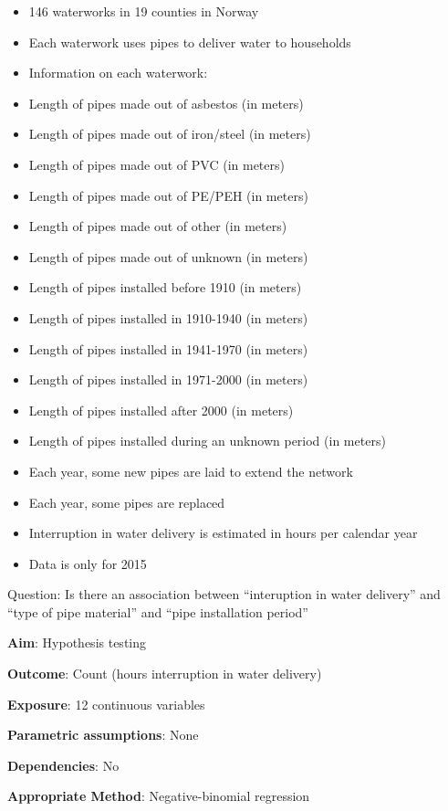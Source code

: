 \documentclass[12pt,]{article}
\providecommand{\tightlist}{%
  \setlength{\itemsep}{0pt}\setlength{\parskip}{0pt}}
\begin{document}
\begin{itemize}
\tightlist
\item
  146 waterworks in 19 counties in Norway
\item
  Each waterwork uses pipes to deliver water to households
\item
  Information on each waterwork:
\item
  Length of pipes made out of asbestos (in meters)
\item
  Length of pipes made out of iron/steel (in meters)
\item
  Length of pipes made out of PVC (in meters)
\item
  Length of pipes made out of PE/PEH (in meters)
\item
  Length of pipes made out of other (in meters)
\item
  Length of pipes made out of unknown (in meters)
\item
  Length of pipes installed before 1910 (in meters)
\item
  Length of pipes installed in 1910-1940 (in meters)
\item
  Length of pipes installed in 1941-1970 (in meters)
\item
  Length of pipes installed in 1971-2000 (in meters)
\item
  Length of pipes installed after 2000 (in meters)
\item
  Length of pipes installed during an unknown period (in meters)
\item
  Each year, some new pipes are laid to extend the network
\item
  Each year, some pipes are replaced
\item
  Interruption in water delivery is estimated in hours per calendar year
\item
  Data is only for 2015
\end{itemize}

Question: Is there an association between ``interuption in water
delivery'' and ``type of pipe material'' and ``pipe installation
period''

\textbf{Aim}: Hypothesis testing

\textbf{Outcome}: Count (hours interruption in water delivery)

\textbf{Exposure}: 12 continuous variables

\textbf{Parametric assumptions}: None

\textbf{Dependencies}: No

\textbf{Appropriate Method}: Negative-binomial regression
\end{document}
